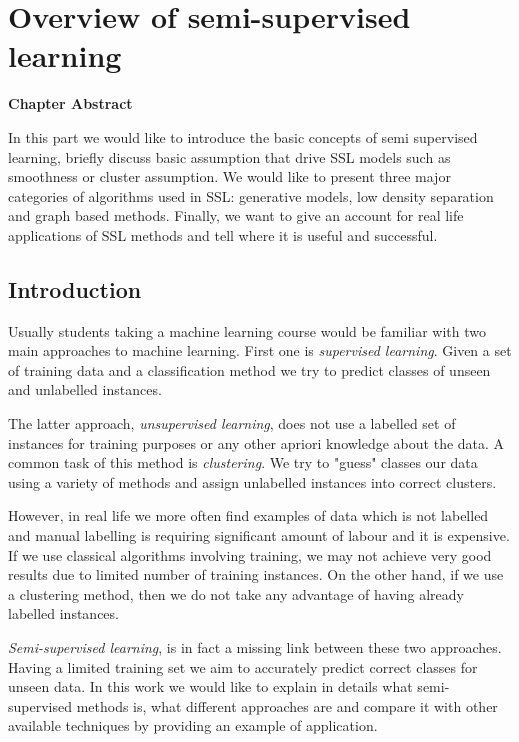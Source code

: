 \documentclass[12pt, a4paper, pdflatex]{report}
\newenvironment{chapabstract}
{
	\vspace{0.5cm}
	\small
	\begin{center}
    \bfseries Chapter Abstract
    \end{center}
}{\vspace{1.5cm}}
\begin{document}
\newpage

\tableofcontents
\thispagestyle{empty}
\cleardoublepage
\pagestyle{plain}
\setcounter{page}{1}

\newpage

\chapter{Overview of semi-supervised learning\label{ch:sstheory}}

\begin{chapabstract}
In this part we would like to introduce the basic concepts of semi supervised learning, briefly discuss basic assumption that drive SSL models such as smoothness or cluster assumption. We would like to present three major categories of algorithms used in SSL: generative models, low density separation and graph based methods. Finally, we want to give an account for real life applications of SSL methods and tell where it is useful and successful.
\end{chapabstract}


\section{Introduction}
Usually students taking a machine learning course would be familiar with two main approaches to machine learning. First one is \textit{supervised learning}. Given a set of training data and a classification method we try to predict classes of unseen and unlabelled instances. 

The latter approach, \textit{unsupervised learning}, does not use a labelled set of instances for training purposes or any other apriori knowledge about the data. A common task of this method is \textit{clustering}. We try to "guess" classes our data using a variety of methods and assign unlabelled instances into correct clusters.

However, in real life we more often find examples of data which is not labelled and manual labelling is requiring significant amount of labour and it is expensive\cite{Blum98, He07}. If we use classical algorithms involving training, we may not achieve very good results due to limited number of training instances. On the other hand, if we use a clustering method, then we do not take any advantage of having already labelled instances.

\textit{Semi-supervised learning}, is in fact a missing link between these two approaches. Having a limited training set we aim to accurately predict correct classes for unseen data. In this work we would like to explain in details what semi-supervised methods is, what different approaches are and compare it with other available techniques by providing an example of application.
\end{document}
